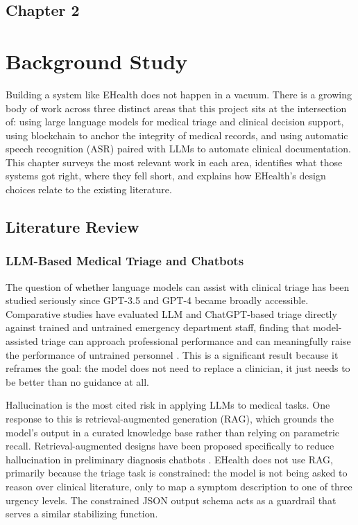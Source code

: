 \begin{center}
    \section*{\fontsize{20}{20}\selectfont Chapter 2}
\end{center}
\vspace{10mm}
\section{Background Study}

Building a system like EHealth does not happen in a vacuum. There is a growing body of work across three distinct areas that this project sits at the intersection of: using large language models for medical triage and clinical decision support, using blockchain to anchor the integrity of medical records, and using automatic speech recognition (ASR) paired with LLMs to automate clinical documentation. This chapter surveys the most relevant work in each area, identifies what those systems got right, where they fell short, and explains how EHealth's design choices relate to the existing literature.

\subsection{Literature Review}

\subsubsection{LLM-Based Medical Triage and Chatbots}

The question of whether language models can assist with clinical triage has been studied seriously since GPT-3.5 and GPT-4 became broadly accessible. Comparative studies have evaluated LLM and ChatGPT-based triage directly against trained and untrained emergency department staff, finding that model-assisted triage can approach professional performance and can meaningfully raise the performance of untrained personnel \cite{triage_llm_2024}. This is a significant result because it reframes the goal: the model does not need to replace a clinician, it just needs to be better than no guidance at all.

\noindent Hallucination is the most cited risk in applying LLMs to medical tasks. One response to this is retrieval-augmented generation (RAG), which grounds the model's output in a curated knowledge base rather than relying on parametric recall. Retrieval-augmented designs have been proposed specifically to reduce hallucination in preliminary diagnosis chatbots \cite{inclusive_healthcare_2025}. EHealth does not use RAG, primarily because the triage task is constrained: the model is not being asked to reason over clinical literature, only to map a symptom description to one of three urgency levels. The constrained JSON output schema acts as a guardrail that serves a similar stabilizing function.

